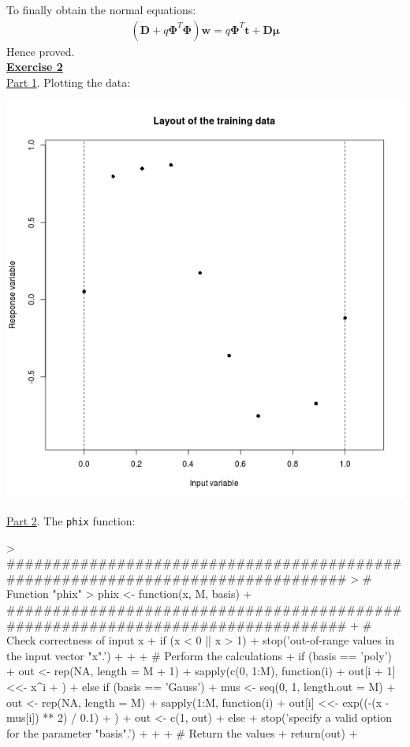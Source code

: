 \documentclass[a4paper, 11pt]{article}
\begin{document}
To finally obtain the normal equations:
\begin{eqnarray}
\left( \mathbf{D} + q \mathbf{\Phi}^T \mathbf{\Phi} \right) \mathbf{w} = q\mathbf{\Phi}^T \mathbf{t} + \mathbf{D\mu} \nonumber
\end{eqnarray}
Hence proved.\\
\newpage
\textbf{\underline{Exercise 2}}\\
\newline \underline{Part 1}. Plotting the data:\\
\begin{center}
\includegraphics[scale=0.6]{ps2_plot1.png}
\end{center}
\underline{Part 2}. The \texttt{phix} function:
\begin{Schunk}
\begin{Sinput}
> ################################################################################
> # Function "phix"
> phix <- function(x, M, basis) {
+ ################################################################################
+   # Check correctness of input x
+   if (x < 0 || x > 1) {
+     stop('out-of-range values in the input vector "x".')
+   }
+   
+   # Perform the calculations  
+   if (basis == 'poly') {
+     out <- rep(NA, length = M + 1)
+     sapply(c(0, 1:M), function(i) {
+       out[i + 1] <<- x^i
+     })
+   } else if (basis == 'Gauss') {
+     mus <- seq(0, 1, length.out = M)
+     out <- rep(NA, length = M)
+     sapply(1:M, function(i) {
+       out[i] <<- exp((-(x - mus[i]) ** 2) / 0.1)
+     })
+     out <- c(1, out)
+   } else {
+     stop('specify a valid option for the parameter "basis".')
+   }
+   
+   # Return the values
+   return(out)
+ }
\end{Sinput}
\end{Schunk}
\end{document}
